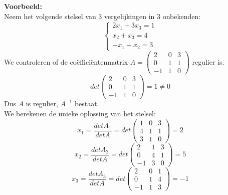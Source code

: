 {\bf Voorbeeld:} \\

Neem het volgende stelsel van $3$ vergelijkingen in $3$ onbekenden:
\[
\left\{ \begin{array}{c} 2x_1 +3x_3 =1 \\ x_2 + x_3 =4 \\ -x_1 + x_2 =3 \end{array}  
\right.
\]
We controleren of de co\"{e}ffici\"{e}ntenmatrix $A=\left( \begin{matrix} 2 & 0 & 3 \\ 0 & 1 & 1 \\ -1 & 1 & 0 \end{matrix} \right)$ regulier is.
\[ det \left( \begin{matrix} 2 & 0 & 3 \\ 0 & 1 & 1 \\ -1 & 1 & 0 \end{matrix} \right) = 1 \neq 0 \]
Dus $A$ is regulier, $A^{-1}$ bestaat.\\ 

We berekenen de unieke oplossing van het stelsel:
\[  x_1 =\frac{det A_1}{det A}=det \left( \begin{matrix} 1 & 0 & 3 \\ 4 & 1 & 1 \\ 3 & 1 & 0 \end{matrix} \right) = 2 \]
\[  x_2 =\frac{det A_2}{det A}=det \left( \begin{matrix} 2 & 1 & 3 \\ 0 & 4 & 1 \\ -1 & 3 & 0 \end{matrix} \right) = 5 \] 
\[  x_3 =\frac{det A_3}{det A}=det \left( \begin{matrix} 2 & 0 & 1 \\ 0 & 1 & 4 \\ -1 & 1 & 3 \end{matrix} \right) = -1 \]                     


